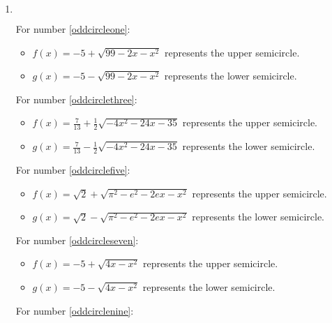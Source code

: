 \documentclass{ximera}
\begin{document}
\begin{enumerate}
\setcounter{enumi}{\value{HW}}

\item $~$


For number \ref{oddcircleone}:

\begin{itemize}

\item  $f(x) = -5 + \sqrt{99-2x-x^2}$ represents the upper semicircle.

\item  $g(x) = -5 - \sqrt{99-2x-x^2}$ represents the lower semicircle.

\end{itemize}

For number \ref{oddcirclethree}:

\begin{itemize}

\item  $f(x) = \frac{7}{13} + \frac{1}{2} \sqrt{-4x^2-24x-35}$ represents the upper semicircle.

\item  $g(x) = \frac{7}{13} - \frac{1}{2} \sqrt{-4x^2-24x-35}$ represents the lower semicircle.

\end{itemize}

For number \ref{oddcirclefive}:

\begin{itemize}

\item  $f(x) = \sqrt{2} + \sqrt{\pi^2-e^2-2ex-x^2}$ represents the upper semicircle.

\item  $g(x) = \sqrt{2} - \sqrt{\pi^2-e^2-2ex-x^2}$  represents the lower semicircle.

\end{itemize}


For number \ref{oddcircleseven}:

\begin{itemize}

\item  $f(x) = -5 + \sqrt{4x-x^2}$ represents the upper semicircle.

\item  $g(x) =  -5 - \sqrt{4x-x^2}$   represents the lower semicircle.

\end{itemize}

For number \ref{oddcirclenine}:


\end{enumerate}
\end{document}
